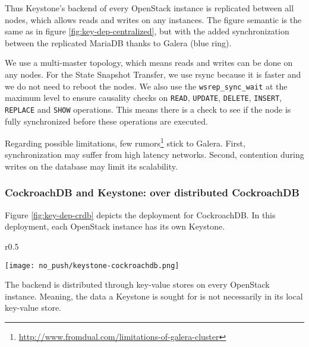  Thus Keystone’s backend of every OpenStack instance is replicated between all nodes, which allows reads and writes on any instances. The figure semantic is the same as in figure \ref{fig:key-dep-centralized}, but with the added synchronization between the replicated MariaDB thanks to Galera (blue ring).

We use a multi-master topology, which means reads and writes can be done on any nodes. For the State Snapshot Transfer, we use rsync because it is faster and we do not need to reboot the nodes. We also use the \verb+wsrep_sync_wait+ at the maximum level to ensure causality checks on \verb+READ+, \verb+UPDATE+, \verb+DELETE+, \verb+INSERT+, \verb+REPLACE+ and \verb+SHOW+ operations. This means there is a check to see if the node is fully synchronized before these operations are executed.

Regarding possible limitations, few rumors\footnote{\url{http://www.fromdual.com/limitations-of-galera-cluster}} stick to Galera. First, synchronization may suffer from high latency networks. Second, contention during writes on the database may limit its scalability.




\subsubsection{CockroachDB and Keystone: over distributed CockroachDB}
Figure \ref{fig:key-dep-crdb} depicts the deployment for CockroachDB. In this deployment, each OpenStack instance has its own Keystone.

\begin{wrapfigure}{r}{0.5\textwidth}
  \vspace{-20pt}
  \begin{center}
    \texttt{[image: no\_push/keystone-cockroachdb.png]}
  \end{center}
  \vspace{-20pt}
  \caption{Keystone deployment with CockroachDB.}
  \vspace{-12pt}
  \label{fig:key-dep-crdb}
\end{wrapfigure}

The backend is distributed through key-value stores on every OpenStack instance. Meaning, the data a Keystone is sought for is not necessarily in its local key-value store.

